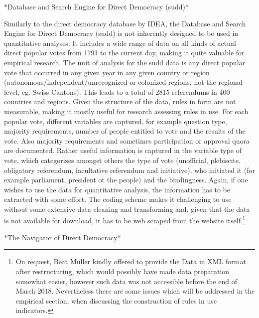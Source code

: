 \documentclass{systats}
\begin{document}
*Database and Search Engine for Direct Democracy (sudd)*

Similarly to the direct democracy database by IDEA, the Database and Search Engine for Direct Democracy (sudd) is not inherently designed to be used in quantitative analyses. It includes a wide range of data on all kinds of actual direct popular votes from 1791 to the current day, making it quite valuable for empirical research. The unit of analysis for the sudd data is any direct popular vote that occurred in any given year in any given country or region (autonomous/independent/unrecognized or colonized regions, not the regional level, eg. Swiss Cantons). This leads to a total of 2815 referendums in 400 countries and regions. Given the structure of the data, rules in form are not measurable, making it mostly useful for research assessing rules in use. For each popular vote, different variables are captured, for example question type, majority requirements, number of people entitled to vote and the results of the vote. Also majority requirements and sometimes participation or approval quora are documented. Rather useful information is captured in the variable type of vote, which categorizes amongst others the type of vote (unofficial, plebiscite, obligatory referendum, facultative referendum and initiative), who initiated it (for example parliament, president ot the people) and the bindingness. Again, if one wishes to use the data for quantitative analysis, the information has to be extracted with some effort. The coding scheme makes it challenging to use without some extensive data cleaning and transforming and, given that the data is not available for download, it has to be web scraped from the website itself.\footnote{On request, Beat Müller kindly offered to provide the Data in XML format after restructuring, which would possibly have made data preparation somewhat easier, however such data was not accessible before the end of March 2018. Nevertheless there are some issues which will be addressed in the empirical section, when discussing the construction of rules in use indicators.}

*The Navigator of Direct Democracy*
\end{document}

